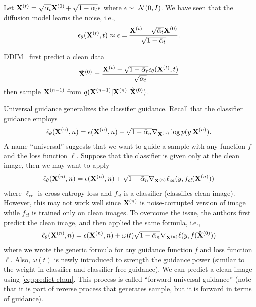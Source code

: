\documentclass[11pt]{article}
\begin{document}
Let ${\bf X}^{(t)} = \sqrt{\bar{\alpha}_t} {\bf X}^{(0)} + \sqrt{1-\bar{\alpha}_t} \epsilon$
where $\epsilon\sim~{\cal N}(0, I)$.
We have seen that the diffusion model learns the noise, i.e.,
\begin{align}
    \epsilon_{\theta}({\bf X}^{(t)}, t) \approx \epsilon = \frac{{\bf X}^{(t)} - \sqrt{\bar{\alpha}_t} {\bf X}^{(0)}}{\sqrt{1-\bar{\alpha}_t}}.
\end{align}

DDIM~\cite{song2020denoising} first predict a clean data
\begin{align}
    \hat{{\bf X}}^{(0)} = \frac{{\bf X}^{(t)} - \sqrt{1-\bar{\alpha}_t} \epsilon_\theta({\bf X}^{(t)}, t)}{\sqrt{\bar{\alpha}_t}}\label{eq:predict clean}
\end{align}
then sample ${\bf X}^{(n-1)}$ from $q({\bf X}^{(n-1)}|{\bf X}^{(n)}, \hat{{\bf X}}^{(0)})$.

Universal guidance generalizes the classifier guidance.
Recall that the classifier guidance employs 
\begin{align}
    \hat{\epsilon}_{\theta} ({\bf X}^{(n)}, n) = \epsilon({\bf X}^{(n)}, n) - \sqrt{1-\bar{\alpha}_n}\nabla_{{\bf X}^{(n)}} \log p(y|{\bf X}^{(n)}).
\end{align}
A name ``universal'' suggests that we want to guide a sample with any function $f$ and the loss function $\ell$.
Suppose that the classifier is given only at the clean image, then we may want to apply 
\begin{align}
    \hat{\epsilon}_{\theta} ({\bf X}^{(n)}, n) = \epsilon({\bf X}^{(n)}, n) + \sqrt{1-\bar{\alpha}_n}\nabla_{{\bf X}^{(n)}} \ell_{ce}(y, f_{cl}({\bf X}^{(n)}))
\end{align}
where $\ell_{ce}$ is cross entropy loss and $f_{cl}$ is a classifier (classifies clean image).
However, this may not work well since ${\bf X}^{(n)}$ is noise-corrupted version of image while $f_{cl}$ is trained only on clean images.
To overcome the issue, the authors first predict the clean image, and then applied the same formula, i.e.,
\begin{align}
    \hat{\epsilon}_{\theta} ({\bf X}^{(n)}, n) = \epsilon({\bf X}^{(n)}, n) + \omega(t) \sqrt{1-\bar{\alpha}_n}\nabla_{{\bf X}^{(n)}} \ell(y, f(\hat{{\bf X}}^{(0)}))
\end{align}
where we wrote the generic formula for any guidance function $f$ and loss function $\ell$.
Also, $\omega(t)$ is newly introduced to strength the guidance power (similar to the weight in classifier and classifier-free guidance).
We can predict a clean image using \eqref{eq:predict clean}.
This process is called ``forward universal guidance'' (note that it is part of reverse process that generates sample, but it is forward in terms of guidance).
\end{document}

